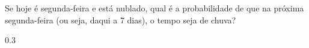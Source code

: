 \documentclass[pdftex, brazil, 12pt, oneside, addpoints]{exam}
\newcommand{\umalinha}{\fillwithlines{0.25in}}
\begin{document}
\begin{questions}
\question
Se hoje é segunda-feira e está nublado, qual é a probabilidade de que
na próxima segun\-da-feira (ou seja, daqui a 7 dias), o tempo seja de chuva?
\begin{solutionorlines}[0.25in]
  $0.3$
\end{solutionorlines}




\end{questions}
\end{document}
